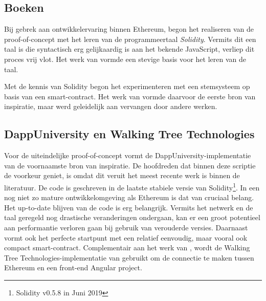 	\subsection{Boeken}
	Bij gebrek aan ontwikkelervaring binnen Ethereum, begon het realiseren van de proof-of-concept met het leren van de programmeertaal \textit{Solidity}. Vermits dit een taal is die syntactisch erg gelijkaardig is aan het bekende JavaScript, verliep dit proces vrij vlot. Het werk van \textcite{Antonopoulos2018} vormde een stevige basis voor het leren van de taal.
	
	Met de kennis van Solidity begon het experimenteren met een stemsysteem op basis van een smart-contract. Het werk van \textcite{Mukhopadhyay2018} vormde daarvoor de eerste bron van inspiratie, maar werd geleidelijk aan vervangen door andere werken.
	
	\subsection{DappUniversity en Walking Tree Technologies}
	Voor de uiteindelijke proof-of-concept vormt de DappUniversity-implementatie van \textcite{McCubin2019}  de voornaamste bron van inspiratie. De hoofdreden dat \textcite{McCubin2019} binnen deze scriptie de voorkeur geniet, is omdat dit veruit het meest recente werk is binnen de literatuur. De code is geschreven in de laatste stabiele versie van Solidity\footnote{Solidity v0.5.8 in Juni 2019}. In een nog niet zo mature ontwikkelomgeving als Ethereum is dat van cruciaal belang. Het up-to-date blijven van de code is erg belangrijk. Vermits het netwerk en de taal geregeld nog drastische veranderingen ondergaan, kan er een groot potentieel aan performantie verloren gaan bij gebruik van verouderde versies. Daarnaast vormt \textcite{McCubin2019} ook het perfecte startpunt met een relatief eenvoudig, maar vooral ook compact smart-contract. Complementair aan het werk van \textcite{McCubin2019}, wordt de Walking Tree Technologies-implementatie van \textcite{Ranjan2018} gebruikt om de connectie te maken tussen Ethereum en een front-end Angular project.
	
